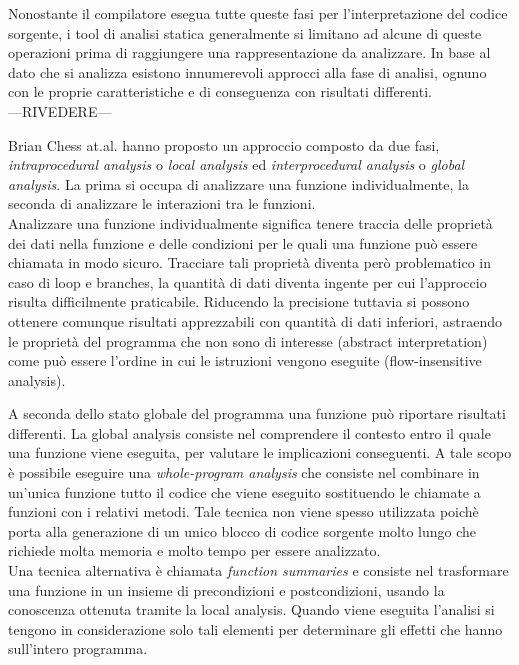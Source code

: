 Nonostante il compilatore esegua tutte queste fasi per l'interpretazione del codice sorgente, i tool di analisi statica generalmente si limitano ad alcune di queste operazioni prima di raggiungere una rappresentazione da analizzare.
In base al dato che si analizza esistono innumerevoli approcci alla fase di analisi, ognuno con le proprie caratteristiche e di conseguenza con risultati differenti.\\

---RIVEDERE---

Brian Chess at.al.\cite{CITAZIONE 1 NEL PAPER DE POEL} hanno proposto un approccio composto da due fasi, \emph{intraprocedural analysis} o \emph{local analysis} ed \emph{interprocedural analysis} o \emph{global analysis}. La prima si occupa di analizzare una funzione individualmente, la seconda di analizzare le interazioni tra le funzioni.\\
Analizzare una funzione individualmente significa tenere traccia delle proprietà dei dati nella funzione e delle condizioni per le quali una funzione può essere chiamata in modo sicuro. Tracciare tali proprietà diventa però problematico in caso di loop e branches, la quantità di dati diventa ingente per cui l'approccio risulta difficilmente praticabile. Riducendo la precisione tuttavia si possono ottenere comunque risultati apprezzabili con quantità di dati inferiori, astraendo le proprietà del programma che non sono di interesse (abstract interpretation) come può essere l'ordine in cui le istruzioni vengono eseguite (flow-insensitive analysis).

A seconda dello stato globale del programma una funzione può riportare risultati differenti. La global analysis consiste nel comprendere il contesto entro il quale una funzione viene eseguita, per valutare le implicazioni conseguenti. A tale scopo è possibile eseguire una \emph{whole-program analysis} che consiste nel combinare in un'unica funzione tutto il codice che viene eseguito sostituendo le chiamate a funzioni con i relativi metodi. Tale tecnica non viene spesso utilizzata poichè porta alla generazione di un unico blocco di codice sorgente molto lungo che richiede molta memoria e molto tempo per essere analizzato.\\
Una tecnica alternativa è chiamata \emph{function summaries} e consiste nel trasformare una funzione in un insieme di precondizioni e postcondizioni, usando la conoscenza ottenuta tramite la local analysis. Quando viene eseguita l'analisi si tengono in considerazione solo tali elementi per determinare gli effetti che hanno sull'intero programma. 


